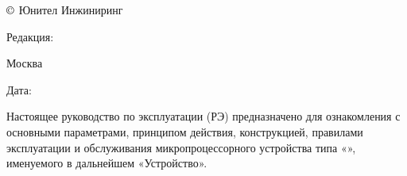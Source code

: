\pagestyle{plain}

\pagecolor{white}

\noindent
$\copyright$ \the\year{} Юнител Инжиниринг
\hfill
\parbox{0.3\textwidth}{\raggedleft Редакция: \textcolor{unigray}{\rev}}

\vspace{3mm}
\noindent
Москва
\hfill
\parbox{0.3\textwidth}{\raggedleft Дата: \textcolor{unigray}{\revdate}}
\vspace{8mm}

Настоящее руководство по эксплуатации (РЭ) предназначено для ознакомления с основными параметрами, принципом действия, конструкцией, правилами эксплуатации и обслуживания микропроцессорного устройства типа «\devicetype», именуемого в дальнейшем «Устройство».

